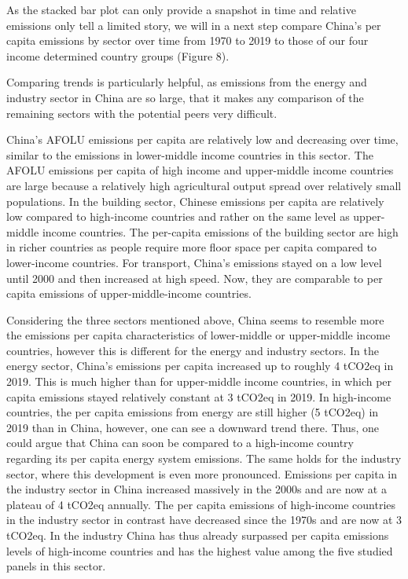 \documentclass[
  12pt,
]{article}
\numberwithin{equation}{section}
\numberwithin{table}{section}
\numberwithin{figure}{section}
\begin{document}
As the stacked bar plot can only provide a snapshot in time and relative
emissions only tell a limited story, we will in a next step compare
China's per capita emissions by sector over time from 1970 to 2019 to
those of our four income determined country groups (Figure 8).

Comparing trends is particularly helpful, as emissions from the energy
and industry sector in China are so large, that it makes any comparison
of the remaining sectors with the potential peers very difficult.

China's AFOLU emissions per capita are relatively low and decreasing
over time, similar to the emissions in lower-middle income countries in
this sector. The AFOLU emissions per capita of high income and
upper-middle income countries are large because a relatively high
agricultural output spread over relatively small populations. In the
building sector, Chinese emissions per capita are relatively low
compared to high-income countries and rather on the same level as
upper-middle income countries. The per-capita emissions of the building
sector are high in richer countries as people require more floor space
per capita compared to lower-income countries. For transport, China's
emissions stayed on a low level until 2000 and then increased at high
speed. Now, they are comparable to per capita emissions of
upper-middle-income countries.

Considering the three sectors mentioned above, China seems to resemble
more the emissions per capita characteristics of lower-middle or
upper-middle income countries, however this is different for the energy
and industry sectors. In the energy sector, China's emissions per capita
increased up to roughly 4 tCO2eq in 2019. This is much higher than for
upper-middle income countries, in which per capita emissions stayed
relatively constant at 3 tCO2eq in 2019. In high-income countries, the
per capita emissions from energy are still higher (5 tCO2eq) in 2019
than in China, however, one can see a downward trend there. Thus, one
could argue that China can soon be compared to a high-income country
regarding its per capita energy system emissions. The same holds for the
industry sector, where this development is even more pronounced.
Emissions per capita in the industry sector in China increased massively
in the 2000s and are now at a plateau of 4 tCO2eq annually. The per
capita emissions of high-income countries in the industry sector in
contrast have decreased since the 1970s and are now at 3 tCO2eq. In the
industry China has thus already surpassed per capita emissions levels of
high-income countries and has the highest value among the five studied
panels in this sector.
\end{document}
